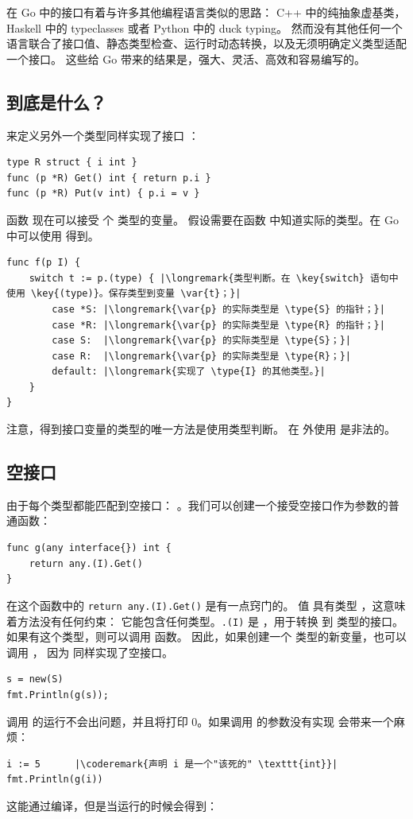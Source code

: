 在 Go 中的接口有着与许多其他编程语言类似的思路：
C++ 中的纯抽象虚基类，Haskell 中的 typeclasses 或者 Python 中的 duck typing。
然而没有其他任何一个语言联合了接口值、静态类型检查、运行时动态转换，以及无须明确定义类型适配一个接口。
这些给 Go 带来的结果是，强大、灵活、高效和容易编写的。

\subsection{到底是什么？}
来定义另外一个类型同样实现了接口 ：
\begin{lstlisting}[caption=实现了 I 的另一个类型]
type R struct { i int }
func (p *R) Get() int { return p.i }
func (p *R) Put(v int) { p.i = v }
\end{lstlisting}
函数  现在可以接受  个  类型的变量。
假设需要在函数  中知道实际的类型。在 Go 中可以使用
  得到。

\begin{lstlisting}
func f(p I) {
    switch t := p.(type) { |\longremark{类型判断。在 \key{switch} 语句中使用 \key{(type)}。保存类型到变量 \var{t}；}|
        case *S: |\longremark{\var{p} 的实际类型是 \type{S} 的指针；}|
        case *R: |\longremark{\var{p} 的实际类型是 \type{R} 的指针；}|
        case S:  |\longremark{\var{p} 的实际类型是 \type{S}；}|
        case R:  |\longremark{\var{p} 的实际类型是 \type{R}；}|
        default: |\longremark{实现了 \type{I} 的其他类型。}|
    }
}
\end{lstlisting}
\showremarks
注意，得到接口变量的类型的唯一方法是使用类型判断。
在  外使用  是非法的。

\subsection{空接口}
由于每个类型都能匹配到空接口：
。我们可以创建一个接受空接口作为参数的普通函数：
\begin{lstlisting}[caption=空接口参数的函数t,label=src:interface empty]
func g(any interface{}) int { 
    return any.(I).Get() 
}
\end{lstlisting}
在这个函数中的 \lstinline{return any.(I).Get()} 是有一点窍门的。
值  具有类型 ，这意味着方法没有任何约束：
它能包含任何类型。\lstinline{.(I)} 是 ，用于转换  到
 类型的接口。如果有这个类型，则可以调用  函数。
因此，如果创建一个  类型的新变量，也可以调用 ，
因为  同样实现了空接口。
\begin{lstlisting}
s = new(S)
fmt.Println(g(s));
\end{lstlisting}
调用  的运行不会出问题，并且将打印 0。如果调用  的参数没有实现  
会带来一个麻烦：
\begin{lstlisting}[caption=接口实现异常,label=src:interface fail]
i := 5		|\coderemark{声明 i 是一个"该死的" \texttt{int}}|
fmt.Println(g(i))
\end{lstlisting}
这能通过编译，但是当运行的时候会得到：

